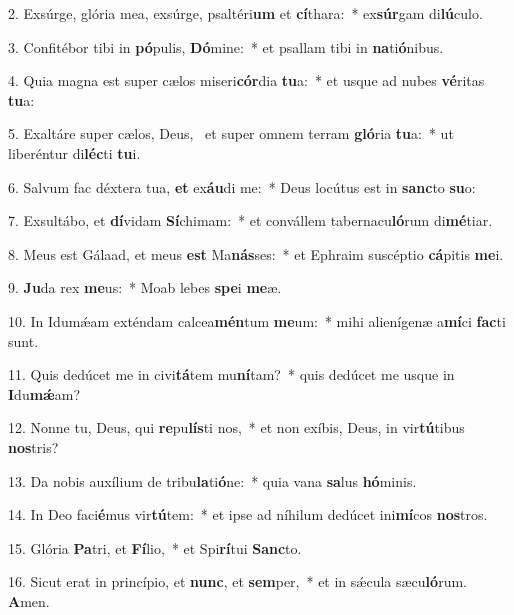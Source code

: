 2. Exsúrge, glória mea, exsúrge, psaltéri\textbf{um} et \textbf{cí}thara:~*  ex\textbf{súr}gam di\textbf{lú}culo.\

3. Confitébor tibi in \textbf{pó}pulis, \textbf{Dó}mine:~*  et psallam tibi in \textbf{na}ti\textbf{ó}nibus.\

4. Quia magna est super cælos miseri\textbf{cór}dia \textbf{tu}a:~*  et usque ad nubes \textbf{vé}ritas \textbf{tu}a:\

5. Exaltáre super cælos, Deus, \dag\  et super omnem terram \textbf{gló}ria \textbf{tu}a:~*  ut liberéntur di\textbf{léc}ti \textbf{tu}i.\

6. Salvum fac déxtera tua, \textbf{et} ex\textbf{áu}di me:~*  Deus locútus est in \textbf{sanc}to \textbf{su}o:\

7. Exsultábo, et \textbf{dí}vidam \textbf{Sí}chimam:~*  et convállem tabernacu\textbf{ló}rum di\textbf{mé}tiar.\

8. Meus est Gálaad, et meus \textbf{est} Ma\textbf{nás}ses:~*  et Ephraim suscéptio \textbf{cá}pitis \textbf{me}i.\

9. \textbf{Ju}da rex \textbf{me}us:~*  Moab lebes \textbf{spe}i \textbf{me}æ.\

10. In Idumǽam exténdam calcea\textbf{mén}tum \textbf{me}um:~*  mihi alienígenæ a\textbf{mí}ci \textbf{fac}ti sunt.\

11. Quis dedúcet me in civi\textbf{tá}tem mu\textbf{ní}tam?~*  quis dedúcet me usque in \textbf{I}du\textbf{mǽ}am?\

12. Nonne tu, Deus, qui \textbf{re}pu\textbf{lís}ti nos,~*  et non exíbis, Deus, in vir\textbf{tú}tibus \textbf{nos}tris?\

13. Da nobis auxílium de tribu\textbf{la}ti\textbf{ó}ne:~*  quia vana \textbf{sa}lus \textbf{hó}minis.\

14. In Deo faci\textbf{é}mus vir\textbf{tú}tem:~*  et ipse ad níhilum dedúcet ini\textbf{mí}cos \textbf{nos}tros.\

15. Glória \textbf{Pa}tri, et \textbf{Fí}lio,~*  et Spi\textbf{rí}tui \textbf{Sanc}to.\

16. Sicut erat in princípio, et \textbf{nunc}, et \textbf{sem}per,~*  et in sǽcula sæcu\textbf{ló}rum. \textbf{A}men.\

